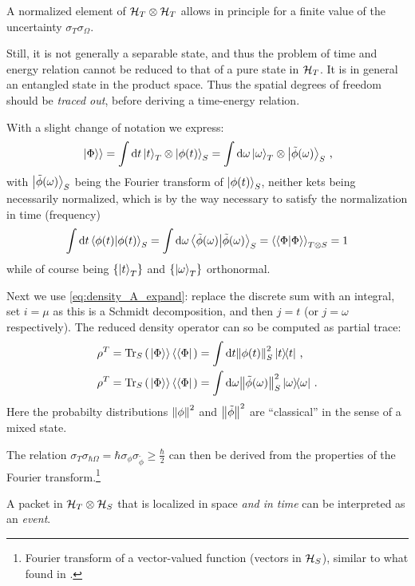 A normalized element of $\mathcal{H}_T \otimes \mathcal{H}_T$ allows in principle for a finite value
of the uncertainty $\sigma_{T}\sigma_{\Omega}$.

Still, it is not generally
a separable state,
and thus
the problem of time and energy relation cannot be reduced to that of
a pure state in $\mathcal{H}_T$.
It is in general an entangled state in the product space.
Thus the spatial degrees of freedom should be \emph{traced out},
before deriving a time-energy relation.

With a slight change of notation we express:
\begin{equation}
  \left.\left| \Phi \right\rangle\right\rangle =
    \int \dd{t} \ket{t}_T \otimes \ket{\phi(t)}_S =
    \int \dd\omega \ket{\omega}_T \otimes \ket{\tilde{\phi}(\omega)}_S \, \text{,}
\end{equation}
with $\ket{\tilde{\phi}(\omega)}_S$ being the Fourier transform
of $\ket{\phi(t)}_S$,
neither kets being necessarily normalized, which is by the way necessary
to satisfy the normalization in time (frequency)
\[
  \int \dd{t} \braket{\phi(t)}_S =
    \int \dd{\omega} \braket{\tilde{\phi}(\omega)}_S =
    \left\langle\left\langle \Phi \middle| \Phi \right\rangle\right\rangle_{T \otimes S} = 
    1
\]
while of course being $\left\{\ket{t}_T\right\}$ and $\left\{\ket{\omega}_T\right\}$
orthonormal.

Next we use \eqref{eq:density_A_expand}: replace the discrete sum with an integral,
set $i = \mu$ as this is a Schmidt decomposition, and then $j = t$
(or $j = \omega$ respectively).
The reduced density operator can so be computed
as partial trace:
\begin{align}
  \label{eq:ptrace_density_matrix_t}
  {\rho}^T = \Tr_S\qty(\left.\left| \Phi \right\rangle\right\rangle\left\langle\left\langle \Phi \right|\right.) &= \int \dd t \norm{\phi(t)}^2_S \ketbra{t}{t}
    \, \text{,}
  \\
  \label{eq:ptrace_density_matrix_omega}
  {\rho}^T = \Tr_S\qty(\left.\left| \Phi \right\rangle\right\rangle\left\langle\left\langle \Phi \right|\right.) &= \int \dd \omega \norm{\tilde{\phi}(\omega)}^2_S \ketbra{\omega}{\omega}
    \,\text{.} 
\end{align}
Here the probabilty distributions $\norm{\phi}^2$ and $\norm{\tilde{\phi}}^2$
are ``classical'' in the sense of a mixed state.

The relation $\sigma_T\sigma_{\hbar\Omega} = \hbar \sigma_{\phi} \sigma_{\tilde{\phi}} \geq \frac{\hbar}{2}$
can then be derived from the properties of the Fourier transform.\footnote{
  Fourier transform of a
  vector-valued function
  (vectors in $\mathcal{H}_S$),
  similar to what found in \cite{Maccone:Pauli}.
}

A packet in $\mathcal{H}_T \otimes \mathcal{H}_S$ that is localized in space \emph{and in time} can be interpreted as an \emph{event}.


